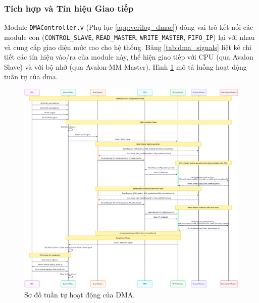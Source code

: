 \FloatBarrier

\subsubsection{Tích hợp và Tín hiệu Giao tiếp}
\label{subsec:integration_signals} %
Module \texttt{DMAController.v} (Phụ lục \ref{app:verilog_dmac}) đóng vai trò kết nối các module con (\texttt{CONTROL\_SLAVE}, \texttt{READ\_MASTER}, \texttt{WRITE\_MASTER}, \texttt{FIFO\_IP}) lại với nhau và cung cấp giao diện mức cao cho hệ thống. Bảng \ref{tab:dma_signals} liệt kê chi tiết các tín hiệu vào/ra của module này, thể hiện giao tiếp với CPU (qua Avalon Slave) và với bộ nhớ (qua Avalon-MM Master). Hình \ref{fig:02_10_SystemSequenceDiagram} mô tả luồng hoạt động tuần tự của \acrshort{dma}.

\begin{figure}[htbp]
    \centering
    \includegraphics[width=\linewidth]{Images/02_10_SystemSequenceDiagram}
    \caption{Sơ đồ tuần tự hoạt động của DMA.}
    \label{fig:02_10_SystemSequenceDiagram}
\end{figure}

